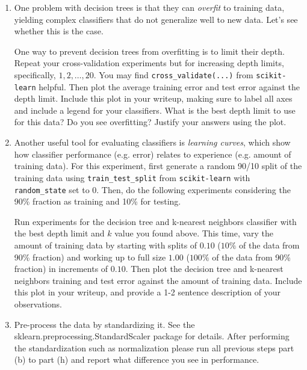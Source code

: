 \begin{enumerate}[resume]
\sol{}

\item {} One problem with decision trees is that they can \emph{overfit} to training data, yielding complex classifiers that do not generalize well to new data. Let's see whether this is the case.

One way to prevent decision trees from overfitting is to limit their depth. Repeat your cross-validation experiments but for increasing depth limits, specifically, $1,2,\ldots,20$. You may find \verb|cross_validate(...)| from \verb|scikit-learn| helpful. Then plot the average training error and test error against the depth limit. 
Include this plot in your writeup, making sure to label all axes and include a legend for your classifiers. What is the best depth limit to use for this data? Do you see overfitting? Justify your answers using the plot.

\sol{}

\item {} Another useful tool for evaluating classifiers is \emph{learning curves}, which show how classifier performance (e.g. error) relates to experience (e.g. amount of training data).
For this experiment, first generate a random 90/10 split of the training data using \verb|train_test_split| from \verb|scikit-learn| with \verb|random_state| set to 0. Then, do the following experiments considering the 90\% fraction as training and 10\% for testing. 

Run experiments for the decision tree and k-nearest neighbors classifier with the best depth limit and $k$ value you found above.
This time, vary the amount of training data by starting with splits of $0.10$ ($10\%$ of the data from 90\% fraction) and working up to full size $1.00$ ($100\%$ of the data from 90\% fraction) in increments of $0.10$. Then plot the decision tree and k-nearest neighbors training and test error against the amount of training data. 
Include this plot in your writeup, and provide a 1-2 sentence description of your observations.

\sol{}

\item {} Pre-process the data by standardizing it. See the sklearn.preprocessing.StandardScaler package for details. After performing the standardization such as normalization please run all previous steps part (b) to part (h) and report what difference you see in performance.   \\

\sol{}

\end{enumerate}


